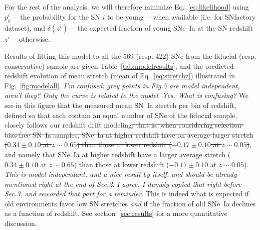 \documentclass[]{aa} %
\newcommand{\nn}[1]{{\textcolor[rgb]{0.25, 0.50, 0}{#1}}}
\newcommand{\yc}[1]{{\textcolor{BrickRed}{#1}}}
\begin{document}
For the rest of the analysis, we will therefore minimize Eq.~\ref{eq:likelihood}
using $p_y^i$ --~the probability for the SN $i$ to be young~-- when available
(i.e. for SNfactory dataset), and $\delta(z^i)$ --~the expected fraction of
young SNe~Ia at the SN redshift $z^i$~-- otherwise.

Results of fitting this model to all the 569 (resp. 422) SNe from the fiducial
(resp. conservative) sample are given Table~\ref{tab:modelresults}, and the
predicted redshift evolution of mean stretch (mean of Eq.~\ref{eq:stretchz})
illustrated in Fig.~\ref{fig:modelall}. \yc{\textit{I'm confused: grey points in
Fig.5 are model independent, aren't they? Only the curve is related to the
model}}. \nn{\textit{Yes. What is confusing?}} We see in this figure that the
measured mean SN~Ia stretch per bin of redshift\nn{, defined so that each
contain an equal number of SNe of the fiducial sample,} closely follows our
redshift drift modeling\nn{\sout{; that is, when considering
selection-bias-free SN~Ia samples, SNe~Ia at higher redshift have on
average larger stretch ($0.34 \pm 0.10$ at $z\sim0.65$) than those at
lower redshift ($-0.17\pm 0.10$ at $z\sim0.05$)}, and namely that SNe~Ia at
higher redshift have a larger average stretch ($0.34\pm 0.10$ at
$z\sim0.65$) than those at lower redshift ($-0.17\pm 0.10$ at $z\sim0.05$)}.
\yc{\textit{This is model-independant, and a nice result by itself, and should
be already mentioned right at the end of Sec.2}}. \nn{\textit{I agree. I dumbly
copied that right before Sec.3, and reworded that part for a reminder}}. This is
indeed what is expected if old environments favor low SN stretches
\citep[e.g.][]{howell2007} \emph{and} if the fraction of old SNe~Ia declines as
a function of redshift. See section~\ref{sec:results} for a more quantitative
discussion.
\end{document}

